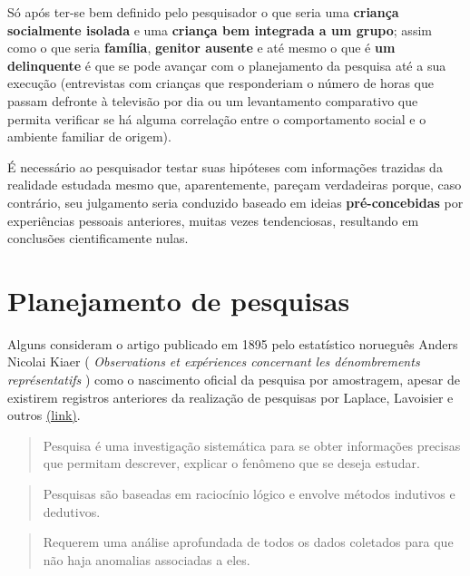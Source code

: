 \documentclass[
]{book}
\begin{document}
\hfill\break

Só após ter-se bem definido pelo pesquisador o que seria uma \textbf{criança socialmente isolada} e uma \textbf{criança bem integrada a um grupo}; assim como o que seria \textbf{família}, \textbf{genitor ausente} e até mesmo o que é \textbf{um delinquente} é que se pode avançar com o planejamento da pesquisa até a sua execução (entrevistas com crianças que responderiam o número de horas que passam defronte à televisão por dia ou um levantamento comparativo que permita verificar se há alguma correlação entre o comportamento social e o ambiente familiar de origem).

\hfill\break

É necessário ao pesquisador testar suas hipóteses com informações trazidas da realidade estudada mesmo que, aparentemente, pareçam verdadeiras porque, caso contrário, seu julgamento seria conduzido baseado em ideias \textbf{pré-concebidas} por experiências pessoais anteriores, muitas vezes tendenciosas, resultando em conclusões cientificamente nulas.

\hypertarget{planejamento-de-pesquisas}{%
\section{Planejamento de pesquisas}\label{planejamento-de-pesquisas}}

Alguns consideram o artigo publicado em 1895 pelo estatístico norueguês Anders Nicolai Kiaer ( \emph{Observations et expériences concernant les dénombrements représentatifs} ) como o nascimento oficial da pesquisa por amostragem, apesar de existirem registros anteriores da realização de pesquisas por Laplace, Lavoisier e outros \href{https://www.jstor.org/stable/pdf/1403151.pdf?seq=1\#page_scan_tab_contents}{(link)}.

\hfill\break

\begin{quote}
Pesquisa é uma investigação sistemática para se obter informações precisas que permitam descrever, explicar o fenômeno que se deseja estudar.
\end{quote}

\hfill\break

\begin{quote}
Pesquisas são baseadas em raciocínio lógico e envolve métodos indutivos e dedutivos.
\end{quote}

\hfill\break

\begin{quote}
Requerem uma análise aprofundada de todos os dados coletados para que não haja anomalias associadas a eles.
\end{quote}
\end{document}
